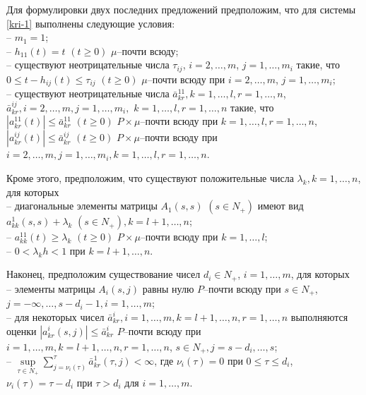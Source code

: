 Для формулировки двух последних предложений предположим, что для
системы \eqref{kri-1} выполнены следующие условия:\\
\noindent
  -- $m_1 =1$;\\
  -- $h_{11}(t) = t \,\, (t \geq 0)$ $\mu $--почти всюду;\\
  -- существуют неотрицательные числа $\tau_{ij}$, $i =
2,\dots,m$, $j = 1,\dots,m_i$  такие, что
 $0 \leq t- h_{ij}(t)
\leq \tau _{ij} {\,} {\,} (t \geq 0)$ $\mu $--почти всюду при $i =
2,\dots,m$, $j = 1,\dots,m_i$;\\
-- существуют неотрицательные числа
  $\bar a^{11}_{kr},  k =1,\dots,l, r =
1,\dots,n$, $\bar a^{ij}_{kr}, i = 2,\dots,m, j = 1,\dots,m_i,$ $k =1,\dots,l,
r = 1,\dots,n$  такие, что $|a^{11}_{kr}(t)|\leq \bar a^{11}_{kr} \,\,
(t\geq 0) $ $P\times\mu$--почти всюду при $k =1,\dots,l, r = 1,\dots,n$,
$|a^{ij}_{kr}(t)|\leq \bar a^{ij}_{kr} \,\, (t\geq 0) $
$P\times\mu$--почти всюду при $i = 2, \dots, m, j = 1,\dots,m_i, k
=1,\dots,l, r = 1,\dots,n$.

Кроме этого, предположим, что существуют положительные числа
$\lambda _k, k = 1, \dots, n$, для которых\\
\noindent
  -- диагональные элементы
матрицы $ A_1(s,s)$ $(s \in N_+)$ имеют вид $a_{kk}^{1}(s,s) +
\lambda _k \,\, (s \in N_+), k=l + 1, \dots, n$;\\
-- $a^{11}_{kk}(t)  \geq
\lambda _k \,\, (t\geq 0)$ $P\times\mu$--почти всюду при $k =
1,\dots,l$;\\
 -- $0 < \lambda _kh < 1$ при $ k = l + 1, \dots, n$.

Наконец, предположим существование чисел $d_i \in N_+$, $i =
1,\dots,m$, для которых\\
\noindent
 -- элементы матрицы $A_i(s,j)$ равны нулю
$P$--почти всюду при $s \in N_+$, $j=-\infty,\dots,s-d_i-1,
i=1,\dots,m$;\\
-- для некоторых чисел $\bar a^i_{kr},i=1,\dots,m, k = l+1, \dots, n, r =
1,\dots,n$ выполняются оценки $|a^i_{kr}(s,j)| \leq \bar a^i_{kr}$
$P$--почти всюду при $i=1,\dots,m, k = l+1, \dots, n, r = 1,\dots,n$, $s
\in N_+, j = s - d_i, \dots, s$;\\
-- $\mathrel {\mathop {\sup} \limits _{\tau \in N_+}}\sum
\limits _{j=\nu _i (\tau)}^{\tau}\bar a^{1}_{kr}(\tau,j) < \infty $,
где $\nu _i (\tau) = 0$ при $0 \le \tau \le d_i$, $\nu _i (\tau) =
\tau - d_i$ при $\tau > d_i$ для $i= 1,\dots,m$.

